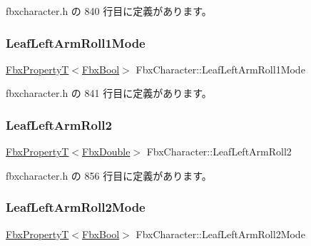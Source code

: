  fbxcharacter.\+h の 840 行目に定義があります。

\mbox{\label{class_fbx_character_ae546e2447e220885cb97b9f27eed09e1}} 
\subsubsection{\texorpdfstring{Leaf\+Left\+Arm\+Roll1\+Mode}{LeafLeftArmRoll1Mode}}
{\footnotesize\ttfamily \hyperlink{class_fbx_property_t}{Fbx\+PropertyT}$<$\hyperlink{fbxtypes_8h_a92e0562b2fe33e76a242f498b362262e}{Fbx\+Bool}$>$ Fbx\+Character\+::\+Leaf\+Left\+Arm\+Roll1\+Mode}



 fbxcharacter.\+h の 841 行目に定義があります。

\mbox{\label{class_fbx_character_a85afb25be41e4215494c040a5e162e14}} 
\subsubsection{\texorpdfstring{Leaf\+Left\+Arm\+Roll2}{LeafLeftArmRoll2}}
{\footnotesize\ttfamily \hyperlink{class_fbx_property_t}{Fbx\+PropertyT}$<$\hyperlink{fbxtypes_8h_a171e72a1c46fc15c1a6c9c31948c1c5b}{Fbx\+Double}$>$ Fbx\+Character\+::\+Leaf\+Left\+Arm\+Roll2}



 fbxcharacter.\+h の 856 行目に定義があります。

\mbox{\label{class_fbx_character_a02394963e116e6ef922a28db31133830}} 
\subsubsection{\texorpdfstring{Leaf\+Left\+Arm\+Roll2\+Mode}{LeafLeftArmRoll2Mode}}
{\footnotesize\ttfamily \hyperlink{class_fbx_property_t}{Fbx\+PropertyT}$<$\hyperlink{fbxtypes_8h_a92e0562b2fe33e76a242f498b362262e}{Fbx\+Bool}$>$ Fbx\+Character\+::\+Leaf\+Left\+Arm\+Roll2\+Mode}



